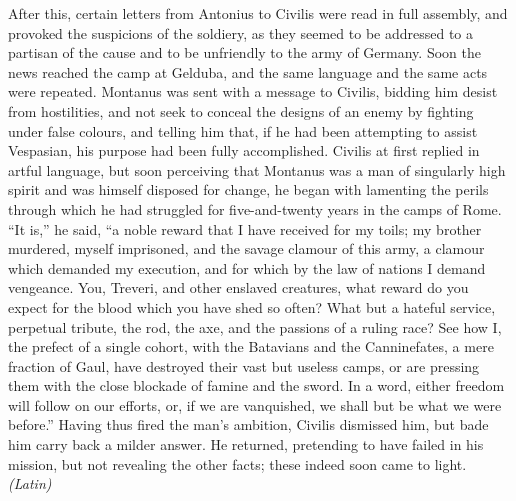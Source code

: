 After this, certain letters from Antonius to Civilis were read in full assembly, and provoked the suspicions of the soldiery, as they seemed to be addressed to a partisan of the cause and to be unfriendly to the army of Germany. Soon the news reached the camp at Gelduba, and the same language and the same acts were repeated. Montanus was sent with a message to Civilis, bidding him desist from hostilities, and not seek to conceal the designs of an enemy by fighting under false colours, and telling him that, if he had been attempting to assist Vespasian, his purpose had been fully accomplished. Civilis at first replied in artful language, but soon perceiving that Montanus was a man of singularly high spirit and was himself disposed for change, he began with lamenting the perils through which he had struggled for five-and-twenty years in the camps of Rome. ``It is,'' he said, ``a noble reward that I have received for my toils; my brother murdered, myself imprisoned, and the savage clamour of this army, a clamour which demanded my execution, and for which by the law of nations I demand vengeance. You, Treveri, and other enslaved creatures, what reward do you expect for the blood which you have shed so often? What but a hateful service, perpetual tribute, the rod, the axe, and the passions of a ruling race? See how I, the prefect of a single cohort, with the Batavians and the Canninefates, a mere fraction of Gaul, have destroyed their vast but useless camps, or are pressing them with the close blockade of famine and the sword. In a word, either freedom will follow on our efforts, or, if we are vanquished, we shall but be what we were before.'' Having thus fired the man's ambition, Civilis dismissed him, but bade him carry back a milder answer. He returned, pretending to have failed in his mission, but not revealing the other facts; these indeed soon came to light. \emph{(Latin)}


